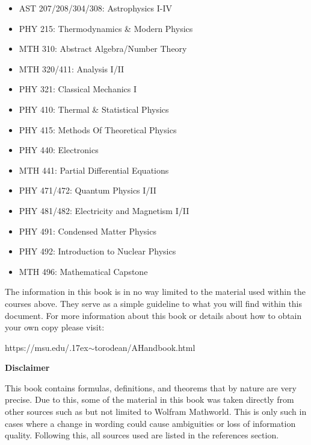 \begin{multicols}{2}
\begin{itemize}
	\item AST 207/208/304/308: Astrophysics I-IV
	\item PHY 215: Thermodynamics \& Modern Physics
	\item MTH 310: Abstract Algebra/Number Theory
	\item MTH 320/411: Analysis I/II
	\item PHY 321: Classical Mechanics I
	\item PHY 410: Thermal \& Statistical Physics
	\item PHY 415: Methods Of Theoretical Physics
	\item PHY 440: Electronics
	\item MTH 441: Partial Differential Equations
	\item PHY 471/472: Quantum Physics I/II
	\item PHY 481/482: Electricity and Magnetism I/II
	\item PHY 491: Condensed Matter Physics
	\item PHY 492: Introduction to Nuclear Physics
	\item MTH 496: Mathematical Capstone
\end{itemize} 
\end{multicols}

The information in this book is in no way limited to the material used within the courses above. They serve as a simple guideline to what you will find within this document. For more information about this book or details about how to obtain your own copy please visit:
\begin{center}
	https://msu.edu/{\raise.17ex\hbox{$\scriptstyle\sim$}}torodean/AHandbook.html
\end{center}
\begin{center}
	\textbf{Disclaimer}
\end{center}

This book contains formulas, definitions, and theorems that by nature are very precise. Due to this, some of the material in this book was taken directly from other sources such as but not limited to Wolfram Mathworld. This is only such in cases where a change in wording could cause ambiguities or loss of information quality.  Following this, all sources used are listed in the references section.
